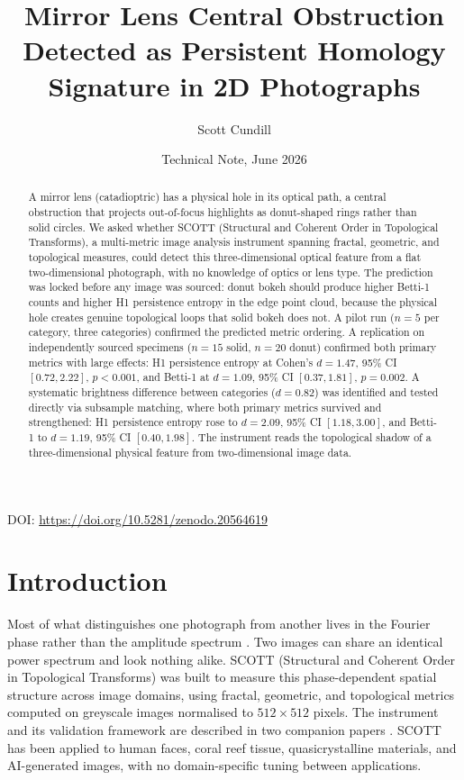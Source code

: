 \documentclass[11pt,a4paper]{article}
\title{Mirror Lens Central Obstruction Detected as Persistent Homology Signature in 2D Photographs}
\author{Scott Cundill}
\affil{Independent Researcher, Okinawa, Japan\\
\texttt{scott.cam@gmail.com}}
\date{Technical Note, June 2026}
\begin{document}
\maketitle

\begin{center}
\small DOI: \url{https://doi.org/10.5281/zenodo.20564619}
\end{center}

\begin{abstract}
A mirror lens (catadioptric) has a physical hole in its optical path, a central obstruction that projects out-of-focus highlights as donut-shaped rings rather than solid circles. We asked whether SCOTT (Structural and Coherent Order in Topological Transforms), a multi-metric image analysis instrument spanning fractal, geometric, and topological measures, could detect this three-dimensional optical feature from a flat two-dimensional photograph, with no knowledge of optics or lens type. The prediction was locked before any image was sourced: donut bokeh should produce higher Betti-1 counts and higher H1 persistence entropy in the edge point cloud, because the physical hole creates genuine topological loops that solid bokeh does not. A pilot run ($n=5$ per category, three categories) confirmed the predicted metric ordering. A replication on independently sourced specimens ($n=15$ solid, $n=20$ donut) confirmed both primary metrics with large effects: H1 persistence entropy at Cohen's $d=1.47$, 95\% CI $[0.72, 2.22]$, $p<0.001$, and Betti-1 at $d=1.09$, 95\% CI $[0.37, 1.81]$, $p=0.002$. A systematic brightness difference between categories ($d=0.82$) was identified and tested directly via subsample matching, where both primary metrics survived and strengthened: H1 persistence entropy rose to $d=2.09$, 95\% CI $[1.18, 3.00]$, and Betti-1 to $d=1.19$, 95\% CI $[0.40, 1.98]$. The instrument reads the topological shadow of a three-dimensional physical feature from two-dimensional image data.
\end{abstract}

\section{Introduction}

Most of what distinguishes one photograph from another lives in the Fourier phase rather than the amplitude spectrum \cite{oppenheim1981}. Two images can share an identical power spectrum and look nothing alike. SCOTT (Structural and Coherent Order in Topological Transforms) was built to measure this phase-dependent spatial structure across image domains, using fractal, geometric, and topological metrics computed on greyscale images normalised to $512 \times 512$ pixels. The instrument and its validation framework are described in two companion papers \cite{cundill2026a, cundill2026b}. SCOTT has been applied to human faces, coral reef tissue, quasicrystalline materials, and AI-generated images, with no domain-specific tuning between applications.
\end{document}
